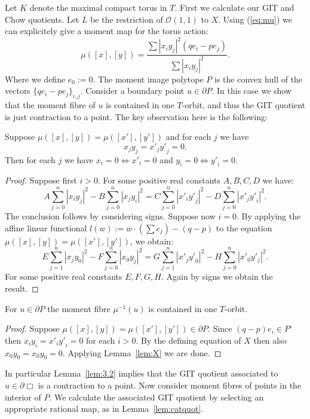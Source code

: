 Let \(K\) denote the maximal compact torus in \(T\).
First we calculate our GIT and Chow quotients. Let \(L\) be the restriction of \(  \mathcal{O}(1,1)\) to \(X\). Using (\ref{eq:mu}) we can explicitely give a moment map for the torus action:
\[
\mu([x],[y]) = \frac{ \sum |x_iy_j|^2( q e_i - p e_j)}{\sum |x_iy_j|^2}.
\]
Where we define \(e_0 := 0\). The moment image polytope \(P\) is the convex hull of the vectors \(\{ q e_i - p e_j \}_{i,j}\). Consider a boundary point \(u \in \partial P\). In this case we show that the moment fibre of \(u\) is contained in one \(T\)-orbit, and thus the GIT quotient is just contraction to a point. The key observation here is the following:
%
%
%
\begin{lemma}\label{lem:X}
Suppose \(\mu([x],[y]) = \mu([x'],[y'])\) and for each \(j\) we have
\[
x_jy_j = {x'}_j{y'}_j = 0.
\]
Then for each \(j\) we have \(x_i=0 \iff {x'}_i = 0\) and \(y_i = 0 \iff {y'}_i = 0 \).
\end{lemma}
%
%
%
\begin{proof}
Suppose first \(i>0\). For some positive real constants \(A,B,C,D\) we have:
\[
A \sum_{j=0}^n |x_iy_j|^2 - B\sum_{j=0}^n  |x_jy_i|^2  = C \sum_{j=0}^n  |{x'}_i{y'}_j|^2 - D \sum_{j=0}^n  |{x'}_j{y'}_i|^2.
\] 
The conclusion follows by considering signs. Suppose now \(i =0\). By applying the affine linear functional \(l(w) := w \cdot \left( \sum e_j \right) - (q-p)\) to the equation \(\mu([x],[y]) = \mu([x'],[y'])\), we obtain:
\[
 E \sum_{j=1}^n  |x_jy_0|^2  - F \sum_{j=0}^n |x_0y_j|^2 =  G \sum_{j=1}^n  |{x'}_j{y'}_0|^2 - H \sum_{j=0}^n  |{x'_0}{y'_j}|^2.
\]
For some positive real constants \(E,F,G,H\). Again by signs we obtain the result.
\end{proof}
%
%
%
\begin{lemma} \label{lem:3.2}
For \(u \in \partial P\) the moment fibre \(\mu^{-1}(u)\) is contained in one \(T\)-orbit.
\end{lemma}
%
%
%
\begin{proof}
Suppose \(\mu([x],[y]) = \mu([{x'}],[{y'}]) \in \partial P\). Since \( (q - p)e_i \in P^\circ\) then \(x_iy_i = {x'}_i{y'}_i = 0\) for each \(i>0\). By the defining equation of \(X\) then also \(x_0y_0 = x_0y_0 = 0\). Applying Lemma~\ref{lem:X} we are done.
\end{proof}
In particular Lemma~\ref{lem:3.2} implies that the GIT quotient associated to \(u \in \partial \Box\) is a contraction to a point.
%
%
%
Now consider moment fibres of points in the interior of \(P\). We calculate the associated GIT quotient by selecting an appropriate rational map, as in Lemma~\ref{lem:catquot}.

